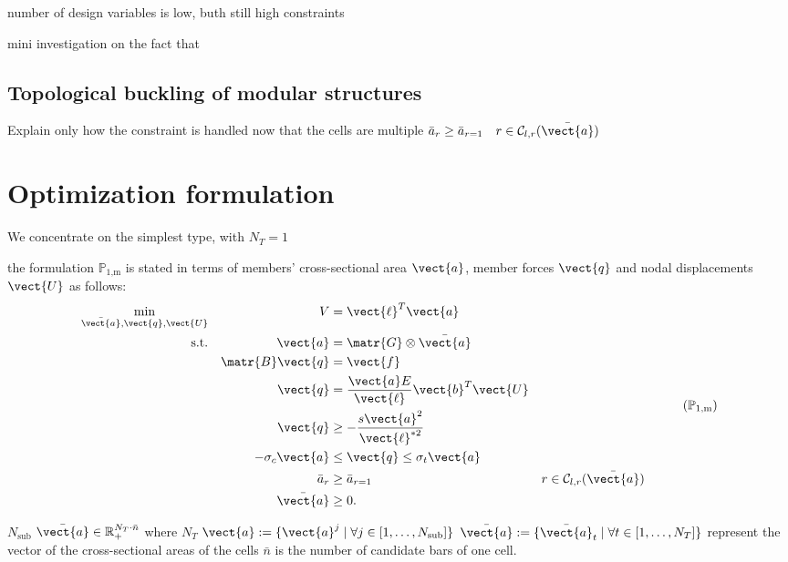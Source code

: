 number of design variables is low, buth still high constraints

mini investigation on the fact that 
\subsection{Topological buckling of modular structures}
Explain only how the constraint is handled now that the cells are multiple $\bar{a}_{r}\geq \bar{a}_{r=1} \quad r \in \mathcal{C}_{l,r}(\bar{\vect{a}})$

\section{Optimization formulation}

We concentrate on the simplest type, with $N_T=1$

the formulation $\mathbb{P}_\text{1,m}$ is stated in terms of members' cross-sectional area $\vect{a}$, member forces $\vect{q}$ and nodal displacements $\vect{U}$ as follows:
\begin{equation}
    \begin{aligned}
    \min_{\bar{\vect{a}}, \vect{q}, \vect{U}}   && V &= \vect{\ell}^{T}\vect{a}\\
    \textrm{s.t.}  && \vect{a} &= \matr{G}\otimes\bar{\vect{a}} \\ 
    && \matr{B}\vect{q} &= \vect{f} && \\
    && \vect{q} &= \frac{\vect{a}E}{\vect{\ell}}\vect{b}^T\vect{U} &&  \\
    && \vect{q} &\geq -\frac{s\vect{a}^2}{\vect{\ell}^{*2}} &&  \\
    && -\sigma_c\vect{a} &\leq \vect{q} \leq \sigma_t\vect{a} &&  \\
    && \bar{a}_{r}&\geq \bar{a}_{r=1} && r \in \mathcal{C}_{l,r}(\bar{\vect{a}}) \\
    && \bar{\vect{a}} &\geq 0. \\
    \end{aligned}
    \tag{$\mathbb{P}_\text{1,m}$}
    \label{eq:optim_complete}
\end{equation}

$N_{\text{sub}}$
${\bar{\vect{a}}} \in \mathbb{R}_+^{N_T \cdot \bar{n}} $ where $N_T$
${\vect{a}} :=  \{\vect{a}^j \;|\; \forall j \in [1,\dots,N_{\text{sub}}]\}$
${\bar{\vect{a}}} :=  \{ \bar{\vect{a}}_t \;|\; \forall t \in [1,\dots,N_T]\}$ represent the vector of the cross-sectional areas of the cells
$\bar{n}$ is the number of candidate bars of one cell.

